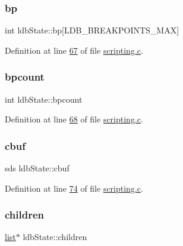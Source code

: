 \subsubsection{\texorpdfstring{bp}{bp}}
{\footnotesize\ttfamily int ldb\+State\+::bp\mbox{[}L\+D\+B\+\_\+\+B\+R\+E\+A\+K\+P\+O\+I\+N\+T\+S\+\_\+\+M\+AX\mbox{]}}



Definition at line \hyperlink{scripting_8c_source_l00067}{67} of file \hyperlink{scripting_8c_source}{scripting.\+c}.

\mbox{\label{structldbState_aac1c2436f5bc19b54803961e4cb23eae}} 
\subsubsection{\texorpdfstring{bpcount}{bpcount}}
{\footnotesize\ttfamily int ldb\+State\+::bpcount}



Definition at line \hyperlink{scripting_8c_source_l00068}{68} of file \hyperlink{scripting_8c_source}{scripting.\+c}.

\mbox{\label{structldbState_aada35936dc0f84981062d304d2839726}} 
\subsubsection{\texorpdfstring{cbuf}{cbuf}}
{\footnotesize\ttfamily sds ldb\+State\+::cbuf}



Definition at line \hyperlink{scripting_8c_source_l00074}{74} of file \hyperlink{scripting_8c_source}{scripting.\+c}.

\mbox{\label{structldbState_a2aa1fb7c2ea304eceb834d64fee94e6c}} 
\subsubsection{\texorpdfstring{children}{children}}
{\footnotesize\ttfamily \hyperlink{structlist}{list}$\ast$ ldb\+State\+::children}



